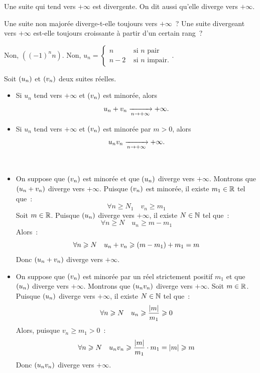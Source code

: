 \documentclass{magnoliaold}
\begin{document}
\begin{remarqueUnique}
\remarque Une suite qui tend vers $+\infty$ est divergente. On dit aussi
  qu'elle diverge vers $+\infty$.
\end{remarqueUnique}

\begin{exoUnique}
\exo Une suite non majorée diverge-t-elle toujours vers $+\infty$~? Une
  suite divergeant vers $+\infty$ est-elle toujours croissante à partir d'un
  certain rang~?
\end{exoUnique}

\begin{sol}
Non, $((-1)^nn)$.
Non, $u_n=\begin{cases}n &\text{ si } n \text{ pair}\\
n-2 &\text{ si } n \text{ impair}.
\end{cases}$.
\end{sol}

\begin{proposition}[utile=-3]
Soit $\left(u_n\right)$ et $\left(v_n\right)$ deux suites réelles.
\begin{itemize}
\item Si $u_n$ tend vers $+\infty$ et $\left(v_n\right)$ est minorée, alors
  \[u_n+v_n \xrightarrow[n\rightarrow +\infty]{} +\infty.\]
\item Si $u_n$ tend vers $+\infty$ et $\left(v_n\right)$ est minorée par $m>0$,
  alors
  \[u_nv_n \xrightarrow[n\rightarrow +\infty]{} +\infty.\]
\end{itemize}
\end{proposition}

\begin{preuve}
$\quad$
\begin{itemize}
\item On suppose que $\left(v_n\right)$ est minorée et que $\left(u_n\right)$ diverge vers
  $+\infty$. Montrons que $\left(u_n+v_n\right)$ diverge vers $+\infty$. Puisque
  $\left(v_n\right)$ est minorée, il existe $m_1\in\mathbb{R}$ tel que~:
  \[\forall n\geq N_1 \quad v_n \geq m_1\]
  Soit $m\in\mathbb{R}$. Puisque $\left(u_n\right)$ diverge vers $+\infty$, il existe $N\in\mathbb{N}$
  tel que~:
  \[\forall n\geq N \quad u_n \geq m-m_1\]
  Alors~:
  \[\forall n\geqslant N \quad u_n+v_n \geqslant \left(m-m_1\right)+m_1=m\]
  Donc $\left(u_n+v_n\right)$ diverge vers $+\infty$.
\item On suppose que $\left(v_n\right)$ est minorée par un réel strictement positif $m_1$
  et que $\left(u_n\right)$ diverge vers $+\infty$. Montrons que $\left(u_n v_n\right)$ diverge
  vers $+\infty$. Soit $m\in\mathbb{R}$. Puisque $\left(u_n\right)$ diverge vers $+\infty$,
  il existe $N\in\mathbb{N}$ tel que~:
  \[\forall n\geqslant N \quad u_n \geqslant \frac{\left|m\right|}{m_1} \geqslant 0\]
  Alors, puisque $v_n \geq m_1 >0$~:
  \[\forall n\geqslant N \quad u_n v_n \geqslant \frac{\left|m\right|}{m_1}\cdot m_1 =
    \left|m\right| \geqslant m\]
  Donc $\left(u_n v_n\right)$ diverge vers $+\infty$.
\end{itemize}
\end{preuve}
\end{document}
